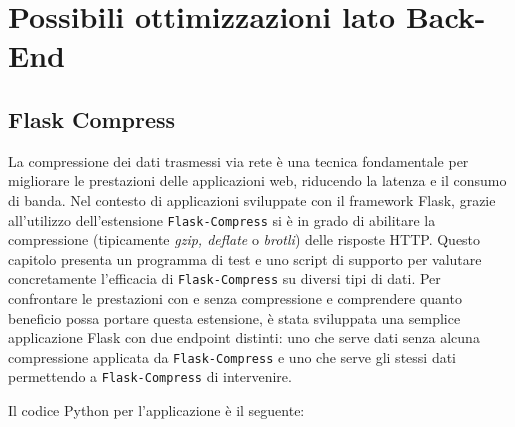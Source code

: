 \section{Possibili ottimizzazioni lato Back-End}
\label{ch:flask-compress-test}

\subsection{Flask Compress}
La compressione dei dati trasmessi via rete è una tecnica fondamentale per migliorare
le prestazioni delle applicazioni web, riducendo la latenza e il consumo di
banda. Nel contesto di applicazioni sviluppate con il framework Flask, grazie
all'utilizzo dell'estensione \texttt{Flask-Compress} si è in grado di abilitare la
compressione (tipicamente \textit{gzip, deflate} o \textit{brotli}) delle risposte
HTTP. Questo capitolo presenta un programma di test e uno script di supporto per
valutare concretamente l'efficacia di \texttt{Flask-Compress} su diversi tipi di
dati. Per confrontare le prestazioni con e senza compressione e comprendere
quanto beneficio possa portare questa estensione, è stata sviluppata una semplice
applicazione Flask con due endpoint distinti: uno che serve dati senza alcuna
compressione applicata da \texttt{Flask-Compress} e uno che serve gli stessi dati
permettendo a \texttt{Flask-Compress} di intervenire.

Il codice Python per l'applicazione è il seguente:

